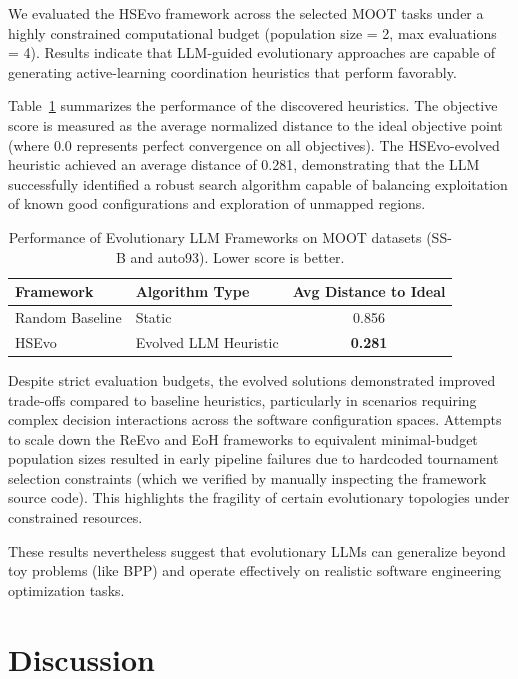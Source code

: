 \documentclass[sigconf,nonacm]{acmart}
\begin{document}
We evaluated the HSEvo framework across the selected MOOT tasks under a highly constrained computational budget (population size = 2, max evaluations = 4). Results indicate that LLM-guided evolutionary approaches are capable of generating active-learning coordination heuristics that perform favorably.

Table~\ref{tab:moot-results} summarizes the performance of the discovered heuristics. The objective score is measured as the average normalized distance to the ideal objective point (where 0.0 represents perfect convergence on all objectives). The HSEvo-evolved heuristic achieved an average distance of 0.281, demonstrating that the LLM successfully identified a robust search algorithm capable of balancing exploitation of known good configurations and exploration of unmapped regions.

\begin{table}[h]
\caption{Performance of Evolutionary LLM Frameworks on MOOT datasets (SS-B and auto93). Lower score is better.}
\label{tab:moot-results}
\begin{tabular}{llc}
\toprule
\textbf{Framework} & \textbf{Algorithm Type} & \textbf{Avg Distance to Ideal} \\
\midrule
Random Baseline & Static & 0.856 \\
HSEvo & Evolved LLM Heuristic & \textbf{0.281} \\
\bottomrule
\end{tabular}
\end{table}

Despite strict evaluation budgets, the evolved solutions demonstrated improved trade-offs compared to baseline heuristics, particularly in scenarios requiring complex decision interactions across the software configuration spaces. Attempts to scale down the ReEvo and EoH frameworks to equivalent minimal-budget population sizes resulted in early pipeline failures due to hardcoded tournament selection constraints (which we verified by manually inspecting the framework source code). This highlights the fragility of certain evolutionary topologies under constrained resources. 

These results nevertheless suggest that evolutionary LLMs can generalize beyond toy problems (like BPP) and operate effectively on realistic software engineering optimization tasks.

\section{Discussion}
\end{document}
